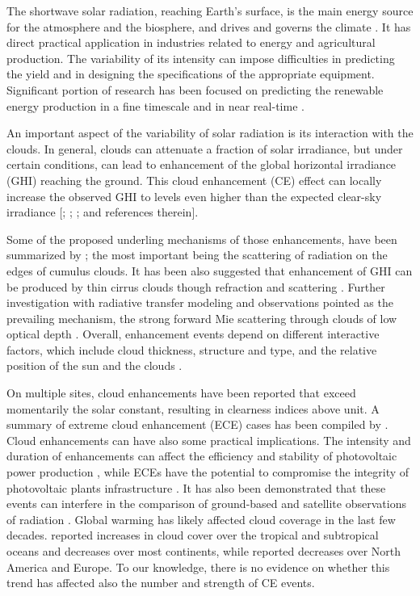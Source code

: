 \documentclass[preprint, 5p,
authoryear]{elsarticle} %
\begin{document}
The shortwave solar radiation, reaching Earth's surface, is the main
energy source for the atmosphere and the biosphere, and drives and
governs the climate \citep{Gray2010}. It has direct practical
application in industries related to energy and agricultural production.
The variability of its intensity can impose difficulties in predicting
the yield and in designing the specifications of the appropriate
equipment. Significant portion of research has been focused on
predicting the renewable energy production in a fine timescale and in
near real-time \citep[for a review see][]{Inman2013, Graabak2016}.

An important aspect of the variability of solar radiation is its
interaction with the clouds. In general, clouds can attenuate a fraction
of solar irradiance, but under certain conditions, can lead to
enhancement of the global horizontal irradiance (GHI) reaching the
ground. This cloud enhancement (CE) effect can locally increase the
observed GHI to levels even higher than the expected clear-sky
irradiance {[}\citet{Cordero2023}; \citet{Vamvakas2020};
\citet{CastillejoCuberos2020}; and references therein{]}.

Some of the proposed underling mechanisms of those enhancements, have
been summarized by \citet{Gueymard2017}; the most important being the
scattering of radiation on the edges of cumulus clouds. It has been also
suggested that enhancement of GHI can be produced by thin cirrus clouds
though refraction and scattering \citep{Thuillier2013}. Further
investigation with radiative transfer modeling and observations pointed
as the prevailing mechanism, the strong forward Mie scattering through
clouds of low optical depth
\citep{Pecenak2016, Thuillier2013, Yordanov2013, Yordanov2015}. Overall,
enhancement events depend on different interactive factors, which
include cloud thickness, structure and type, and the relative position
of the sun and the clouds \citep{Gueymard2017, Veerman2022}.

On multiple sites, cloud enhancements have been reported that exceed
momentarily the solar constant, resulting in clearness indices above
unit. A summary of extreme cloud enhancement (ECE) cases has been
compiled by \citet{Martins2022}. Cloud enhancements can have also some
practical implications. The intensity and duration of enhancements can
affect the efficiency and stability of photovoltaic power production
\citep{Lappalainen2020, Jaervelae2020}, while ECEs have the potential to
compromise the integrity of photovoltaic plants infrastructure
\citep{DoNascimento2019}. It has also been demonstrated that these
events can interfere in the comparison of ground-based and satellite
observations of radiation \citep{Damiani2018}. Global warming has likely
affected cloud coverage in the last few decades. \citet{Liu2023}
reported increases in cloud cover over the tropical and subtropical
oceans and decreases over most continents, while \citet{Dong2023}
reported decreases over North America and Europe. To our knowledge,
there is no evidence on whether this trend has affected also the number
and strength of CE events.
\end{document}
